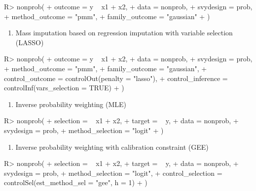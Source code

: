 \documentclass[
]{jss}
\providecommand{\tightlist}{%
  \setlength{\itemsep}{0pt}\setlength{\parskip}{0pt}}
\begin{document}
\begin{CodeChunk}
\begin{CodeInput}
R> nonprob(
+   outcome = y ~ x1 + x2, 
+   data = nonprob, 
+   svydesign = prob, 
+   method_outcome = "pmm", 
+   family_outcome = "gaussian"
+ )
\end{CodeInput}
\end{CodeChunk}

\begin{enumerate}
\def\labelenumi{\arabic{enumi}.}
\setcounter{enumi}{3}
\tightlist
\item
  Mass imputation based on regression imputation with variable selection
  (LASSO)
\end{enumerate}

\begin{CodeChunk}
\begin{CodeInput}
R> nonprob(
+   outcome = y ~ x1 + x2, 
+   data = nonprob, 
+   svydesign = prob, 
+   method_outcome = "pmm", 
+   family_outcome = "gaussian", 
+   control_outcome = controlOut(penalty = "lasso"), 
+   control_inference = controlInf(vars_selection = TRUE)
+ )
\end{CodeInput}
\end{CodeChunk}

\begin{enumerate}
\def\labelenumi{\arabic{enumi}.}
\setcounter{enumi}{4}
\tightlist
\item
  Inverse probability weighting (MLE)
\end{enumerate}

\begin{CodeChunk}
\begin{CodeInput}
R> nonprob(
+   selection =  ~ x1 + x2, 
+   target = ~ y, 
+   data = nonprob, 
+   svydesign = prob, 
+   method_selection = "logit"
+ )
\end{CodeInput}
\end{CodeChunk}

\begin{enumerate}
\def\labelenumi{\arabic{enumi}.}
\setcounter{enumi}{5}
\tightlist
\item
  Inverse probability weighting with calibration constraint (GEE)
\end{enumerate}

\begin{CodeChunk}
\begin{CodeInput}
R> nonprob(
+   selection =  ~ x1 + x2, 
+   target = ~ y, 
+   data = nonprob, 
+   svydesign = prob, 
+   method_selection = "logit", 
+   control_selection = controlSel(est_method_sel = "gee", h = 1)
+ )
\end{CodeInput}
\end{CodeChunk}
\end{document}
